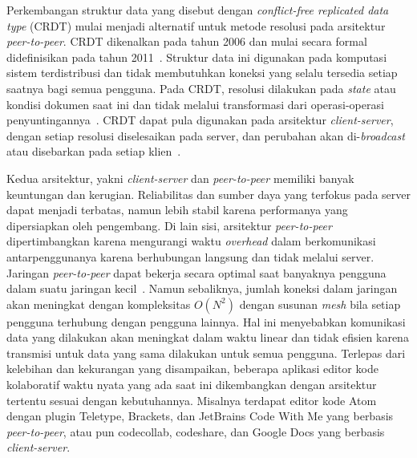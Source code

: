 Perkembangan struktur data yang disebut dengan \textit{conflict-free replicated data type} (CRDT) mulai menjadi alternatif untuk metode resolusi pada arsitektur \textit{peer-to-peer}. CRDT dikenalkan pada tahun 2006 dan mulai secara formal didefinisikan pada tahun 2011~\citep{Shapiro2011}. Struktur data ini digunakan pada komputasi sistem terdistribusi dan tidak membutuhkan koneksi yang selalu tersedia setiap saatnya bagi semua pengguna. Pada CRDT, resolusi dilakukan pada \textit{state} atau kondisi dokumen saat ini dan tidak melalui transformasi dari operasi-operasi penyuntingannya~\citep{CRDToverview1}. CRDT dapat pula digunakan pada arsitektur \textit{client-server}, dengan setiap resolusi diselesaikan pada server, dan perubahan akan di-\textit{broadcast} atau disebarkan pada setiap klien~\citep{Sun2019First}.

Kedua arsitektur, yakni \textit{client-server} dan \textit{peer-to-peer} memiliki banyak keuntungan dan kerugian. Reliabilitas dan sumber daya yang terfokus pada server dapat menjadi terbatas, namun lebih stabil karena performanya yang dipersiapkan oleh pengembang. Di lain sisi, arsitektur \textit{peer-to-peer} dipertimbangkan karena mengurangi waktu \textit{overhead} dalam berkomunikasi antarpenggunanya karena berhubungan langsung dan tidak melalui server. Jaringan \textit{peer-to-peer} dapat bekerja secara optimal saat banyaknya pengguna dalam suatu jaringan kecil~\citep{leibnitz2007peer, maly2003comparison}. Namun sebaliknya, jumlah koneksi dalam jaringan akan meningkat dengan kompleksitas $O(N^2)$ dengan susunan \textit{mesh} bila setiap pengguna terhubung dengan pengguna lainnya. Hal ini menyebabkan komunikasi data yang dilakukan akan meningkat dalam waktu linear dan tidak efisien karena transmisi untuk data yang sama dilakukan untuk semua pengguna. Terlepas dari kelebihan dan kekurangan yang disampaikan, beberapa aplikasi editor kode kolaboratif waktu nyata yang ada saat ini dikembangkan dengan arsitektur tertentu sesuai dengan kebutuhannya. Misalnya terdapat editor kode Atom dengan plugin Teletype, Brackets, dan JetBrains Code With Me yang berbasis \textit{peer-to-peer}, atau pun codecollab, codeshare, dan Google Docs yang berbasis \textit{client-server}.

